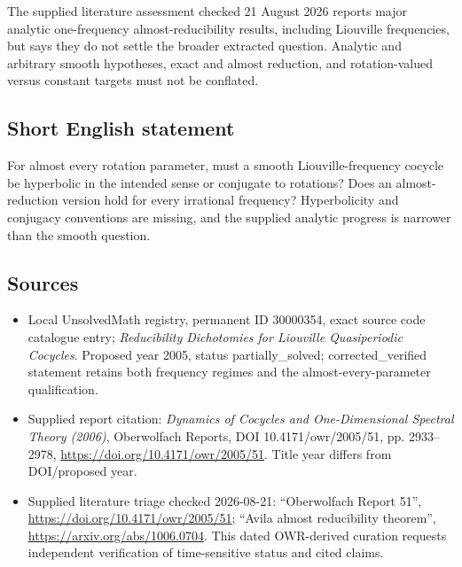 \documentclass[11pt]{article}
\begin{document}
The supplied literature assessment checked 21 August 2026 reports major analytic one-frequency almost-reducibility results, including Liouville frequencies, but says they do not settle the broader extracted question. Analytic and arbitrary smooth hypotheses, exact and almost reduction, and rotation-valued versus constant targets must not be conflated.
\subsection{Short English statement}
For almost every rotation parameter, must a smooth Liouville-frequency cocycle be hyperbolic in the intended sense or conjugate to rotations? Does an almost-reduction version hold for every irrational frequency? Hyperbolicity and conjugacy conventions are missing, and the supplied analytic progress is narrower than the smooth question.
\subsection{Sources}
\begin{itemize}
\item Local UnsolvedMath registry, permanent ID 30000354, exact source code catalogue entry; \emph{Reducibility Dichotomies for Liouville Quasiperiodic Cocycles}. Proposed year 2005, status partially\_solved; corrected\_verified statement retains both frequency regimes and the almost-every-parameter qualification.
\item Supplied report citation: \emph{Dynamics of Cocycles and One-Dimensional Spectral Theory (2006)}, Oberwolfach Reports, DOI 10.4171/owr/2005/51, pp. 2933--2978, \url{https://doi.org/10.4171/owr/2005/51}. Title year differs from DOI/proposed year.
\item Supplied literature triage checked 2026-08-21: ``Oberwolfach Report 51'', \url{https://doi.org/10.4171/owr/2005/51}; ``Avila almost reducibility theorem'', \url{https://arxiv.org/abs/1006.0704}. This dated OWR-derived curation requests independent verification of time-sensitive status and cited claims.
\end{itemize}
\end{document}
